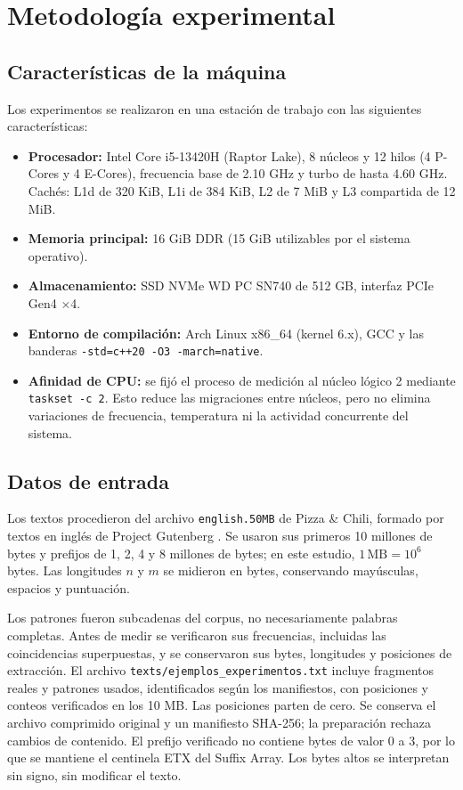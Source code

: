\section{Metodología experimental}

\subsection{Características de la máquina}

Los experimentos se realizaron en una estación de trabajo con las siguientes
características:
\begin{itemize}
    \item \textbf{Procesador:} Intel Core i5-13420H (Raptor Lake), 8 núcleos y
    12 hilos (4 P-Cores y 4 E-Cores), frecuencia base de 2.10 GHz y turbo de
    hasta 4.60 GHz. Cachés: L1d de 320 KiB, L1i de 384 KiB, L2 de 7 MiB y L3
    compartida de 12 MiB.
    \item \textbf{Memoria principal:} 16 GiB DDR (15 GiB utilizables por el
    sistema operativo).
    \item \textbf{Almacenamiento:} SSD NVMe WD PC SN740 de 512 GB, interfaz
    PCIe Gen4 $\times$4.
    \item \textbf{Entorno de compilación:} Arch Linux x86\_64 (kernel 6.x),
    GCC y las banderas \texttt{-std=c++20 -O3 -march=native}.
    \item \textbf{Afinidad de CPU:} se fijó el proceso de medición al núcleo
    lógico 2 mediante \texttt{taskset -c 2}. Esto reduce las migraciones entre
    núcleos, pero no elimina variaciones de frecuencia, temperatura ni la
    actividad concurrente del sistema.
\end{itemize}

\subsection{Datos de entrada}

Los textos procedieron del archivo \texttt{english.50MB} de Pizza \& Chili,
formado por textos en inglés de Project Gutenberg \cite{pizzachili}. Se usaron
sus primeros 10 millones de bytes y prefijos de 1, 2, 4 y 8 millones de bytes;
en este estudio, \(1\,\mathrm{MB}=10^6\) bytes. Las longitudes \(n\) y \(m\)
se midieron en bytes, conservando mayúsculas, espacios y puntuación.

Los patrones fueron subcadenas del corpus, no necesariamente palabras completas.
Antes de medir se verificaron sus frecuencias, incluidas las coincidencias
superpuestas, y se conservaron sus bytes, longitudes y posiciones de extracción.
El archivo \texttt{texts/ejemplos\_experimentos.txt} incluye fragmentos reales
y patrones usados, identificados según los manifiestos, con posiciones y
conteos verificados en los 10 MB. Las posiciones parten de cero.
Se conserva el archivo comprimido original y un manifiesto SHA-256; la
preparación rechaza cambios de contenido. El prefijo verificado no contiene
bytes de valor 0 a 3, por lo que se mantiene el centinela ETX del Suffix Array.
Los bytes altos se interpretan sin signo, sin modificar el texto.

